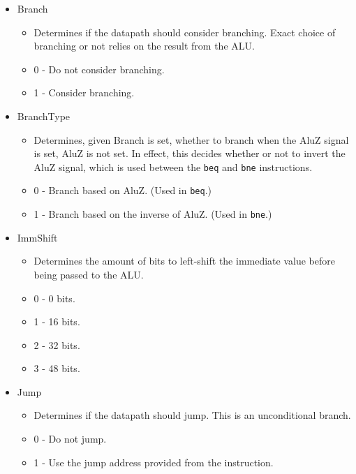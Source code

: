\documentclass[
    paper=letter,
    parskip=half,
    fontsize=12pt,
    titlepage=firstiscover,
    toc=bibliography,
    numbers=endperiod
]{scrartcl}
\providecommand{\tightlist}{%
  \setlength{\itemsep}{0pt}\setlength{\parskip}{0pt}}
\begin{document}
\begin{itemize}
    \item Branch
          \begin{itemize}
              \tightlist
              \item Determines if the datapath should consider branching. Exact choice of
                    branching or not relies on the result from the ALU.
              \item 0 - Do not consider branching.
              \item 1 - Consider branching.
          \end{itemize}

    \item BranchType
          \begin{itemize}
              \tightlist
              \item Determines, given Branch is set, whether to branch when the AluZ signal
                    is set, AluZ is not set. In effect, this decides whether or not to
                    invert the AluZ signal, which is used between the \texttt{beq} and
                    \texttt{bne} instructions.
              \item 0 - Branch based on AluZ. (Used in \texttt{beq}.)
              \item 1 - Branch based on the inverse of AluZ. (Used in \texttt{bne}.)
          \end{itemize}

    \item ImmShift
          \begin{itemize}
              \tightlist
              \item Determines the amount of bits to left-shift the immediate value before
                    being passed to the ALU.
              \item 0 - 0 bits.
              \item 1 - 16 bits.
              \item 2 - 32 bits.
              \item 3 - 48 bits.
          \end{itemize}

    \item Jump
          \begin{itemize}
              \tightlist
              \item Determines if the datapath should jump. This is an unconditional branch.
              \item 0 - Do not jump.
              \item 1 - Use the jump address provided from the instruction.
          \end{itemize}


\end{itemize}
\end{document}
